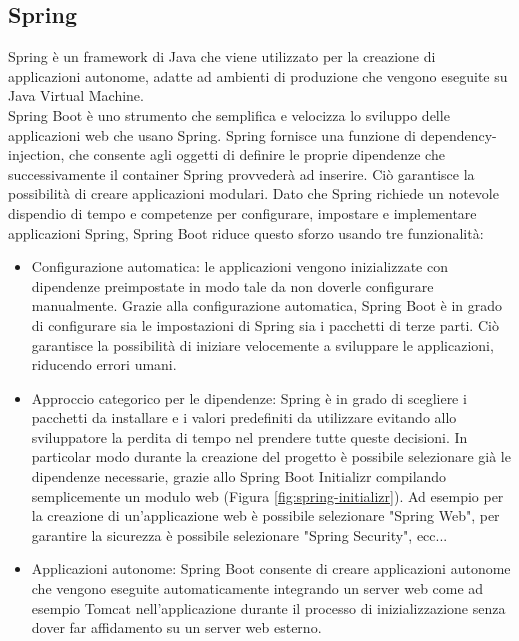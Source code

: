 \subsection{Spring}
Spring è un framework di Java che viene utilizzato per la creazione di applicazioni autonome, adatte ad ambienti di produzione che vengono eseguite su Java Virtual Machine.\\
Spring Boot è uno strumento che semplifica e velocizza lo sviluppo delle applicazioni web che usano Spring.
Spring fornisce una funzione di dependency-injection, che consente agli oggetti di definire le proprie dipendenze che successivamente il container Spring provvederà ad inserire. Ciò garantisce la possibilità di creare applicazioni modulari.
Dato che Spring richiede un notevole dispendio di tempo e competenze per configurare, impostare e implementare applicazioni Spring, Spring Boot riduce questo sforzo usando tre funzionalità\cite{spring}:
\begin{itemize}
    \item Configurazione automatica: le applicazioni vengono inizializzate con dipendenze preimpostate in modo tale da non doverle configurare manualmente. Grazie alla configurazione automatica, Spring Boot è in grado di configurare sia le impostazioni di Spring sia i pacchetti di terze parti. Ciò garantisce la possibilità di iniziare velocemente a sviluppare le applicazioni, riducendo errori umani.
    \item Approccio categorico per le dipendenze: Spring è in grado di scegliere i pacchetti da installare e i valori predefiniti da utilizzare evitando allo sviluppatore la perdita di tempo nel prendere tutte queste decisioni. In particolar modo durante la creazione del progetto è possibile selezionare già le dipendenze necessarie, grazie allo Spring Boot Initializr compilando semplicemente un modulo web (Figura \ref{fig:spring-initializr}). Ad esempio per la creazione di un'applicazione web è possibile selezionare "Spring Web", per garantire la sicurezza è possibile selezionare "Spring Security", ecc...
    \item Applicazioni autonome: Spring Boot consente di creare applicazioni autonome che vengono eseguite automaticamente integrando un server web come ad esempio Tomcat nell'applicazione durante il processo di inizializzazione senza dover far affidamento su un server web esterno.
\end{itemize}
\newpage
